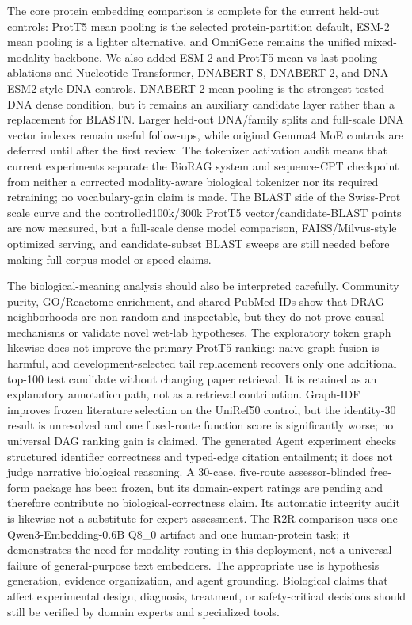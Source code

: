\documentclass[11pt]{article}
\begin{document}
The core protein embedding comparison is complete for the current held-out controls: ProtT5 mean pooling is the selected protein-partition default, ESM-2 mean pooling is a lighter alternative, and OmniGene remains the unified mixed-modality backbone. We also added ESM-2 and ProtT5 mean-vs-last pooling ablations and Nucleotide Transformer, DNABERT-S, DNABERT-2, and DNA-ESM2-style DNA controls. DNABERT-2 mean pooling is the strongest tested DNA dense condition, but it remains an auxiliary candidate layer rather than a replacement for BLASTN. Larger held-out DNA/family splits and full-scale DNA vector indexes remain useful follow-ups, while original Gemma4 MoE controls are deferred until after the first review. The tokenizer activation audit means that current experiments separate the BioRAG system and sequence-CPT checkpoint from neither a corrected modality-aware biological tokenizer nor its required retraining; no vocabulary-gain claim is made. The BLAST side of the Swiss-Prot scale curve and the controlled100k/300k ProtT5 vector/candidate-BLAST points are now measured, but a full-scale dense model comparison, FAISS/Milvus-style optimized serving, and candidate-subset BLAST sweeps are still needed before making full-corpus model or speed claims.

The biological-meaning analysis should also be interpreted carefully. Community purity, GO/Reactome enrichment, and shared PubMed IDs show that DRAG neighborhoods are non-random and inspectable, but they do not prove causal mechanisms or validate novel wet-lab hypotheses. The exploratory token graph likewise does not improve the primary ProtT5 ranking: naive graph fusion is harmful, and development-selected tail replacement recovers only one additional top-100 test candidate without changing paper retrieval. It is retained as an explanatory annotation path, not as a retrieval contribution. Graph-IDF improves frozen literature selection on the UniRef50 control, but the identity-30 result is unresolved and one fused-route function score is significantly worse; no universal DAG ranking gain is claimed. The generated Agent experiment checks structured identifier correctness and typed-edge citation entailment; it does not judge narrative biological reasoning. A 30-case, five-route assessor-blinded free-form package has been frozen, but its domain-expert ratings are pending and therefore contribute no biological-correctness claim. Its automatic integrity audit is likewise not a substitute for expert assessment. The R2R comparison uses one Qwen3-Embedding-0.6B Q8\_0 artifact and one human-protein task; it demonstrates the need for modality routing in this deployment, not a universal failure of general-purpose text embedders. The appropriate use is hypothesis generation, evidence organization, and agent grounding. Biological claims that affect experimental design, diagnosis, treatment, or safety-critical decisions should still be verified by domain experts and specialized tools.
\end{document}
